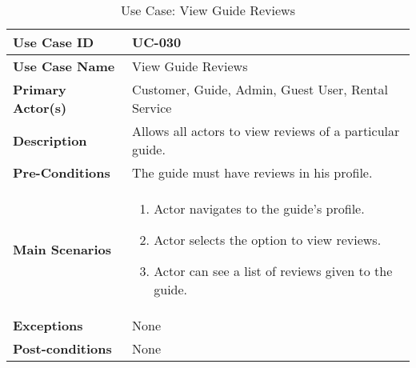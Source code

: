 \begin{table}[ht]
    \centering
    \begin{tabular}{|l|p{}|}
        \hline
        \textbf{Use Case ID} & UC-030 \\
        \hline
        \textbf{Use Case Name} & View Guide Reviews \\
        \hline
        \textbf{Primary Actor(s)} & Customer, Guide, Admin, Guest User, Rental Service \\
        \hline
        \textbf{Description} & Allows all actors to view reviews of a particular guide. \\
        \hline
        \textbf{Pre-Conditions} & The guide must have reviews in his profile. \\
        \hline
        \textbf{Main Scenarios} & 
        \begin{enumerate}[label=\arabic*.,itemsep=0pt]
            \item Actor navigates to the guide's profile.
            \item Actor selects the option to view reviews.
            \item Actor can see a list of reviews given to the guide.
        \end{enumerate} \\
        \hline
        \textbf{Exceptions} & None \\
        \hline
        \textbf{Post-conditions} & None \\
        \hline
    \end{tabular}
    \label{tab:use-case-view-guide-reviews}
    \caption{Use Case: View Guide Reviews}
\end{table}

